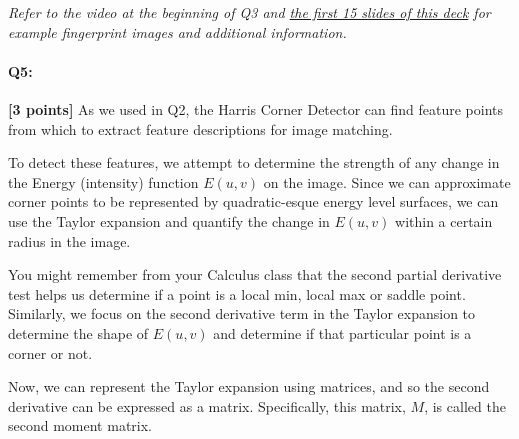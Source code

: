 \documentclass[11pt]{article}
\begin{document}
\begin{enumerate}[(a)]
\begin{tcolorbox}[colback=orange!5!white,colframe=orange!75!black]
    \emph{Refer to the video at the beginning of Q3 and \href{http://biometrics.cse.msu.edu/Presentations/AnilJain_UniquenessOfFingerprints_NAS05.pdf}{the first 15 slides of this deck} for example fingerprint images and additional information.}
    \end{tcolorbox}


\end{enumerate}

\pagebreak




\pagebreak
\paragraph{Q5:} \textbf{[3 points]}
As we used in Q2, the Harris Corner Detector can find feature points from which to extract feature descriptions for image matching.

To detect these features, we attempt to determine the strength of any change in the Energy (intensity) function $E(u, v)$ on the image. Since we can approximate corner points to be represented by quadratic-esque energy level surfaces, we can use the Taylor expansion and quantify the change in $E(u, v)$ within a certain radius in the image.

You might remember from your Calculus class that the second partial derivative test helps us determine if a point is a local min, local max or saddle point. Similarly, we focus on the second derivative term in the Taylor expansion to determine the shape of $E(u, v)$ and determine if that particular point is a corner or not.

Now, we can represent the Taylor expansion using matrices, and so the second derivative can be expressed as a matrix. Specifically, this matrix, $M$, is called the second moment matrix.
\end{document}
